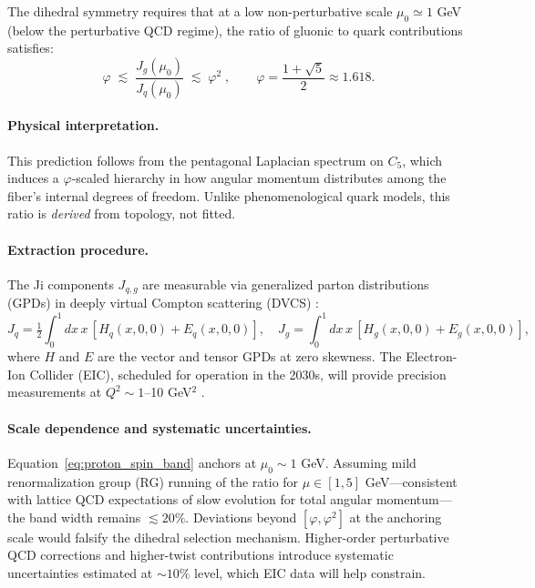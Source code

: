\documentclass[12pt]{article}
\begin{document}
The dihedral symmetry requires that at a low non-perturbative scale $\mu_0 \simeq 1$ GeV (below the perturbative QCD regime), the ratio of gluonic to quark contributions satisfies:
\begin{equation}
\boxed{\;\varphi \;\lesssim\; \frac{J_g(\mu_0)}{J_q(\mu_0)} \;\lesssim\; \varphi^2\;},\qquad 
\varphi=\frac{1+\sqrt{5}}{2} \approx 1.618.
\label{eq:proton_spin_band}
\end{equation}

\paragraph{Physical interpretation.} This prediction follows from the pentagonal Laplacian spectrum on $C_5$, which induces a $\varphi$-scaled hierarchy in how angular momentum distributes among the fiber's internal degrees of freedom. Unlike phenomenological quark models, this ratio is \emph{derived} from topology, not fitted.

\paragraph{Extraction procedure.} The Ji components $J_{q,g}$ are measurable via generalized parton distributions (GPDs) in deeply virtual Compton scattering (DVCS) \cite{eic2022science}:
\begin{equation}
J_q=\tfrac{1}{2}\int_0^1\!dx\, x\,[H_q(x,0,0)+E_q(x,0,0)],\quad
J_g=\int_0^1\!dx\, x\,[H_g(x,0,0)+E_g(x,0,0)],
\end{equation}
where $H$ and $E$ are the vector and tensor GPDs at zero skewness. The Electron-Ion Collider (EIC), scheduled for operation in the 2030s, will provide precision measurements at $Q^2 \sim 1$--10 GeV$^2$ \cite{ethier2023eic}.

\paragraph{Scale dependence and systematic uncertainties.} Equation~\eqref{eq:proton_spin_band} anchors at $\mu_0 \sim 1$ GeV. Assuming mild renormalization group (RG) running of the ratio for $\mu \in [1, 5]$ GeV—consistent with lattice QCD expectations of slow evolution for total angular momentum—the band width remains $\lesssim 20\%$. Deviations beyond $[\varphi, \varphi^2]$ at the anchoring scale would falsify the dihedral selection mechanism. Higher-order perturbative QCD corrections and higher-twist contributions introduce systematic uncertainties estimated at $\sim 10\%$ level, which EIC data will help constrain.
\end{document}
